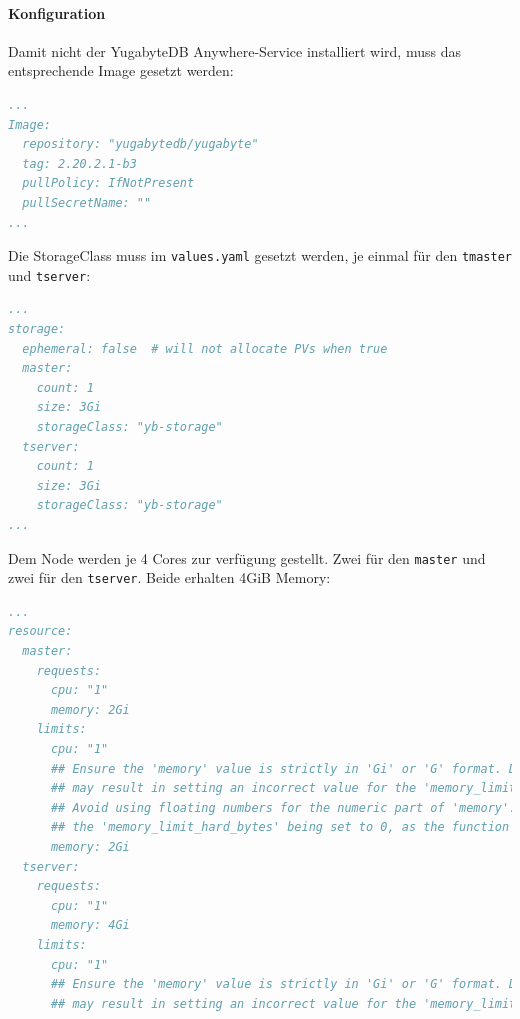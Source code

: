 \begin{flushleft}
    \paragraph{Konfiguration}
    Damit nicht der YugabyteDB Anywhere-Service installiert wird, muss das entsprechende Image gesetzt werden:
    \lstset{style=gra_codestyle}
    \begin{lstlisting}[language=yaml, caption=yugabyteDB - Helm Chart Manifest - Detail Image,captionpos=b,label={lst:yugabytedb-image-setting},breaklines=true]
...
Image:
  repository: "yugabytedb/yugabyte"
  tag: 2.20.2.1-b3
  pullPolicy: IfNotPresent
  pullSecretName: ""
...
    \end{lstlisting}

    Die StorageClass muss im \texttt{values.yaml} gesetzt werden, je einmal für den \texttt{tmaster} und \texttt{tserver}:
    \lstset{style=gra_codestyle}
    \begin{lstlisting}[language=yaml, caption=yugabyteDB - Helm Chart Manifest - Detail StorageClass,captionpos=b,label={lst:yugabytedb-storageclass-setting},breaklines=true]
...
storage:
  ephemeral: false  # will not allocate PVs when true
  master:
    count: 1
    size: 3Gi
    storageClass: "yb-storage"
  tserver:
    count: 1
    size: 3Gi
    storageClass: "yb-storage"
...
    \end{lstlisting}
    Dem Node werden je 4 Cores zur verfügung gestellt.
    Zwei für den \texttt{master} und zwei für den \texttt{tserver}.
    Beide erhalten 4GiB Memory:
    \lstset{style=gra_codestyle}
    \begin{lstlisting}[language=yaml, caption=yugabyteDB - Helm Chart Manifest - Detail Resources,captionpos=b,label={lst:yugabytedb-resources-setting},breaklines=true]
...
resource:
  master:
    requests:
      cpu: "1"
      memory: 2Gi
    limits:
      cpu: "1"
      ## Ensure the 'memory' value is strictly in 'Gi' or 'G' format. Deviating from these formats
      ## may result in setting an incorrect value for the 'memory_limit_hard_bytes' flag.
      ## Avoid using floating numbers for the numeric part of 'memory'. Doing so may lead to
      ## the 'memory_limit_hard_bytes' being set to 0, as the function expects integer values.
      memory: 2Gi
  tserver:
    requests:
      cpu: "1"
      memory: 4Gi
    limits:
      cpu: "1"
      ## Ensure the 'memory' value is strictly in 'Gi' or 'G' format. Deviating from these formats
      ## may result in setting an incorrect value for the 'memory_limit_hard_bytes' flag.

\end{lstlisting}
\end{flushleft}
